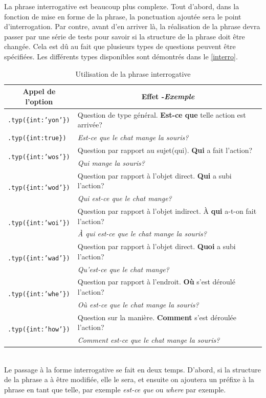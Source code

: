 \documentclass[11pt]{article} %
\newcommand{\real}[1]{\emph{#1}}
\begin{document}
La phrase interrogative est beaucoup plus complexe.
Tout d'abord, dans la fonction de mise en forme de la phrase, la
ponctuation ajoutée sera le point d'interrogation. Par contre, avant
d'en arriver là, la réalisation de la phrase devra passer par une
série de tests pour savoir si la structure de la phrase doit être
changée. Cela est dû au fait que plusieurs types de questions peuvent
être spécifiées. Les différents types disponibles sont démontrés 
dans le \autoref{interro}.
\begin{table}[ht]
\caption{Utilisation de la phrase interrogative}
\begin{tabular}{|l|l|}
\hline 
\multicolumn{1}{|c}{Appel de l'option} & \multicolumn{1}{|c|}{Effet -\small{\real{Exemple}}}\\
\hline 
\hline 
\texttt{.typ(\{int:'yon'\})} & Question de type général.\textbf{ Est-ce que} telle action est arrivée? \\
\texttt{.typ(\{int:true\})} & \small{\real{Est-ce que le chat mange la souris?}}\\
\hline
\multirow{2}{*}{\texttt{.typ(\{int:'wos'\})}} & Question par rapport au sujet(qui). \textbf{Qui} a fait l'action?\\
& \small{\real{Qui mange la souris?}}\\ \hline
\multirow{2}{*}{\texttt{.typ(\{int:'wod'\})}} & Question par rapport à l'objet direct. \textbf{Qui} a subi l'action?\\
& \small{\real{Qui est-ce que le chat mange?}}\\
\hline 
\multirow{2}{*}{\texttt{.typ(\{int:'woi'\})}} & Question par rapport à l'objet indirect. À \textbf{qui} a-t-on fait
l'action?\\
&\small{\real{À qui est-ce que le chat mange la souris?}}\\
\hline 
\multirow{2}{*}{\texttt{.typ(\{int:'wad'\})}} & Question par rapport à l'objet direct. \textbf{Quoi} a subi l'action?\\
&\small{\real{Qu'est-ce que le chat mange?}} \\ \hline 
\multirow{2}{*}{\texttt{.typ(\{int:'whe'\})}} & Question par rapport à l'endroit. \textbf{Où }s'est déroulé l'action?\\
& \small{\real{Où est-ce que le chat mange la souris?}} \\ \hline 
\multirow{2}{*}{\texttt{.typ(\{int:'how'\})}} & Question sur la manière. \textbf{Comment }s'est déroulée l'action?\\
& \small{\real{Comment est-ce que le chat mange la souris?}} \\ \hline 
\end{tabular}
\label{interro}
\end{table}
\\
Le passage à la forme interrogative se fait en deux temps. D'abord,
si la structure de la phrase a à être modifiée, elle le sera, et ensuite
on ajoutera un préfixe à la phrase en tant que telle, par exemple
\emph{est-ce que }ou \emph{where} par exemple.
\end{document}
